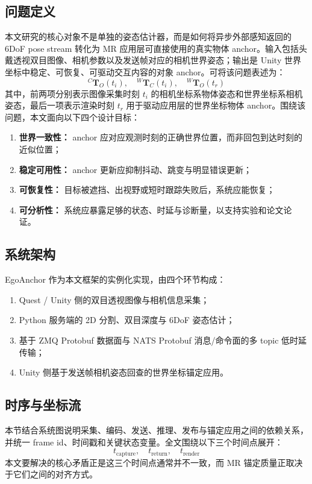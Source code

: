 \documentclass[review]{vgtc}
\begin{document}
\subsection{问题定义}
本文研究的核心对象不是单独的姿态估计器，而是如何将异步外部感知返回的 6DoF pose stream 转化为 MR 应用层可直接使用的真实物体 anchor。输入包括头戴透视双目图像、相机参数以及发送帧对应的相机世界姿态；输出是 Unity 世界坐标中稳定、可恢复、可驱动交互内容的对象 anchor。可将该问题表述为：
\[
{}^{C}\mathbf{T}_{O}(t_i), \quad {}^{W}\mathbf{T}_{C}(t_i), \quad {}^{W}\mathbf{T}_{O}(t_r)
\]
其中，前两项分别表示图像采集时刻 \(t_i\) 的相机坐标系物体姿态和世界坐标系相机姿态，最后一项表示渲染时刻 \(t_r\) 用于驱动应用层的世界坐标物体 anchor。围绕该问题，本文面向以下四个设计目标：
\begin{enumerate}
  \item \textbf{世界一致性：} anchor 应对应观测时刻的正确世界位置，而非回包到达时刻的近似位置；
  \item \textbf{稳定可用性：} anchor 更新应抑制抖动、跳变与明显错误更新；
  \item \textbf{可恢复性：} 目标被遮挡、出视野或短时跟踪失败后，系统应能恢复；
  \item \textbf{可分析性：} 系统应暴露足够的状态、时延与诊断量，以支持实验和论文论证。
\end{enumerate}

\subsection{系统架构}
EgoAnchor 作为本文框架的实例化实现，由四个环节构成：
\begin{enumerate}
  \item Quest / Unity 侧的双目透视图像与相机信息采集；
  \item Python 服务端的 2D 分割、双目深度与 6DoF 姿态估计；
  \item 基于 ZMQ Protobuf 数据面与 NATS Protobuf 消息/命令面的多 topic 低时延传输；
  \item Unity 侧基于发送帧相机姿态回查的世界坐标锚定应用。
\end{enumerate}

\subsection{时序与坐标流}
本节结合系统图说明采集、编码、发送、推理、发布与锚定应用之间的依赖关系，并统一 frame id、时间戳和关键状态变量。全文围绕以下三个时间点展开：
\[
t_{\text{capture}},\quad t_{\text{return}},\quad t_{\text{render}}
\]
本文要解决的核心矛盾正是这三个时间点通常并不一致，而 MR 锚定质量正取决于它们之间的对齐方式。
\end{document}
